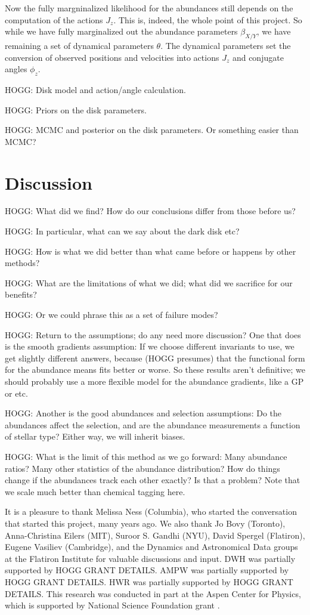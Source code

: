 \documentclass[modern]{aastex63}
\begin{document}
Now the fully margninalized likelihood for the abundances still depends on the computation
of the actions $J_z$. This is, indeed, the whole point of this project.
So while we have fully marginalized out the abundance parameters $\beta_{X/Y}$, we have
remaining a set of dynamical parameters $\theta$.
The dynamical parameters set the conversion of observed positions and velocities into actions $J_z$
and conjugate angles $\phi_z$.

HOGG: Disk model and action/angle calculation.

HOGG: Priors on the disk parameters.

HOGG: MCMC and posterior on the disk parameters. Or something easier than MCMC?

\section{Discussion}

HOGG: What did we find? How do our conclusions differ from those before us?

HOGG: In particular, what can we say about the dark disk etc?

HOGG: How is what we did better than what came before or happens by other methods?

HOGG: What are the limitations of what we did; what did we sacrifice for our benefits?

HOGG: Or we could phrase this as a set of failure modes?

HOGG: Return to the assumptions; do any need more discussion? One that does is the smooth
gradients assumption: If we choose different invariants to use, we get slightly different
answers, because (HOGG presumes) that the functional form for the abundance means fits
better or worse. So these results aren't definitive; we should probably use a more flexible
model for the abundance gradients, like a GP or etc.

HOGG: Another is the good abundances and selection assumptions: Do the abundances affect
the selection, and are the abundance measurements a function of stellar type? Either way,
we will inherit biases.

HOGG: What is the limit of this method as we go forward: Many abundance ratios? Many other
statistics of the abundance distribution? How do things change if the abundances track
each other exactly? Is that a problem? Note that we scale much better than chemical tagging
here.

\acknowledgments
It is a pleasure to thank
  Melissa Ness (Columbia),
  who started the conversation that started this project, many years ago.
We also thank
  Jo Bovy (Toronto),
  Anna-Christina Eilers (MIT),
  Suroor S. Gandhi (NYU),
  David Spergel (Flatiron),
  Eugene Vasiliev (Cambridge),
  and the Dynamics and Astronomical Data groups at the Flatiron Institute
for valuable discussions and input.
DWH was partially supported by HOGG GRANT DETAILS.
AMPW was partially supported by HOGG GRANT DETAILS.
HWR was partially supported by HOGG GRANT DETAILS.
This research was conducted in part at the Aspen Center for Physics,
which is supported by National Science Foundation grant .
\end{document}
